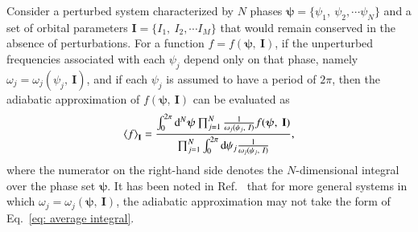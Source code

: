 \documentclass[aps,prx,reprint,superscriptaddress,nofootinbib,longbibliography]{revtex4-1}
\begin{document}
Consider a perturbed system characterized by $N$ phases $\boldsymbol{\psi}=\{\psi_{1},\ \psi_{2},\cdots\psi_{N}\}$ and a set of orbital parameters $\mathbf{I}=\{I_1,\ I_2,\cdots I_{M}\}$ that would remain conserved in the absence of perturbations. For a function $f=f(\boldsymbol{\psi},\ \mathbf{I})$, if the unperturbed frequencies associated with each $\psi_{j}$ depend only on that phase, namely $\omega_{j}=\omega_{j}(\psi_{j},\ \mathbf{I})$, and if each $\psi_{j}$ is assumed to have a period of $2\pi$, then the adiabatic approximation of $f(\boldsymbol{\psi},\ \mathbf{I})$ can be evaluated as~\cite{PhysRevD.83.044037}
\begin{equation}
    \expval{f}_{\mathbf{I}}=\frac{\int_{0}^{2\pi}\mathrm{d}^{N}\boldsymbol{\psi}\prod_{j=1}^{N}\frac{1}{\omega_{j}(\psi_{j},\ I)}f(\boldsymbol{\psi},\ \mathbf{I})}{\prod_{j=1}^{N}\int_{0}^{2\pi}\mathrm{d}\psi_{j}\frac{1}{\omega_{j}(\psi_{j},\ I)}},
    \label{eq: average integral}
\end{equation}
where the numerator on the right-hand side denotes the $N$-dimensional integral over the phase set $\boldsymbol{\psi}$. It has been noted in Ref.~\cite{PhysRevD.83.044037} that for more general systems in which $\omega_{j}=\omega_{j}(\boldsymbol{\psi},\ \mathbf{I})$, the adiabatic approximation may not take the form of Eq.~\eqref{eq: average integral}.
\end{document}
